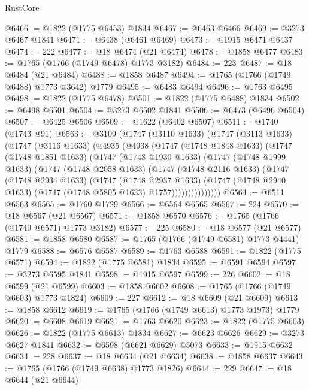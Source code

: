 \begin{lexlean}{RustCore}
\begin{coremodule}
@6466 := @1822 (@1775 @6453) @1834
@6467 := @6463 @6466
@6469 := @3273 @6467 @1841
@6471 := @6438 (@6461 @6469)
@6473 := @1915 @6471 @6437
@6474 := 222
@6477 := @18 @6474 (@21 @6474)
@6478 := @1858 @6477
@6483 := @1765 (@1766 (@1749 @6478) @1773 @3182)
@6484 := 223
@6487 := @18 @6484 (@21 @6484)
@6488 := @1858 @6487
@6494 := @1765 (@1766 (@1749 @6488) @1773 @3642) @1779
@6495 := @6483 @6494
@6496 := @1763 @6495
@6498 := @1822 (@1775 @6478)
@6501 := @1822 (@1775 @6488) @1834
@6502 := @6498 @6501
@6504 := @3273 @6502 @1841
@6506 := @6473 (@6496 @6504)
@6507 := @6425 @6506
@6509 := @1622 (@6402 @6507)
@6511 := @1740 (@1743 @91)
@6563 := @3109
    (@1747
      (@3110 @1633)
      (@1747
        (@3113 @1633)
        (@1747
          (@3116 @1633)
          (@4935
            (@4938
              (@1747
                (@1748 @1848 @1633)
                (@1747
                  (@1748 @1851 @1633)
                  (@1747
                    (@1748 @1930 @1633)
                    (@1747
                      (@1748 @1999 @1633)
                      (@1747
                        (@1748 @2058 @1633)
                        (@1747
                          (@1748 @2116 @1633)
                          (@1747
                            (@1748 @2934 @1633)
                            (@1747
                              (@1748 @2937 @1633)
                              (@1747
                                (@1748 @2940 @1633)
                                (@1747 (@1748 @5805 @1633) @1757)))))))))))))))
@6564 := @6511 @6563
@6565 := @1760 @1729
@6566 := @6564 @6565
@6567 := 224
@6570 := @18 @6567 (@21 @6567)
@6571 := @1858 @6570
@6576 := @1765 (@1766 (@1749 @6571) @1773 @3182)
@6577 := 225
@6580 := @18 @6577 (@21 @6577)
@6581 := @1858 @6580
@6587 := @1765 (@1766 (@1749 @6581) @1773 @4441) @1779
@6588 := @6576 @6587
@6589 := @1763 @6588
@6591 := @1822 (@1775 @6571)
@6594 := @1822 (@1775 @6581) @1834
@6595 := @6591 @6594
@6597 := @3273 @6595 @1841
@6598 := @1915 @6597
@6599 := 226
@6602 := @18 @6599 (@21 @6599)
@6603 := @1858 @6602
@6608 := @1765 (@1766 (@1749 @6603) @1773 @1824)
@6609 := 227
@6612 := @18 @6609 (@21 @6609)
@6613 := @1858 @6612
@6619 := @1765 (@1766 (@1749 @6613) @1773 @1973) @1779
@6620 := @6608 @6619
@6621 := @1763 @6620
@6623 := @1822 (@1775 @6603)
@6626 := @1822 (@1775 @6613) @1834
@6627 := @6623 @6626
@6629 := @3273 @6627 @1841
@6632 := @6598 (@6621 @6629) @5073
@6633 := @1915 @6632
@6634 := 228
@6637 := @18 @6634 (@21 @6634)
@6638 := @1858 @6637
@6643 := @1765 (@1766 (@1749 @6638) @1773 @1826)
@6644 := 229
@6647 := @18 @6644 (@21 @6644)

\end{coremodule}
\end{lexlean}

